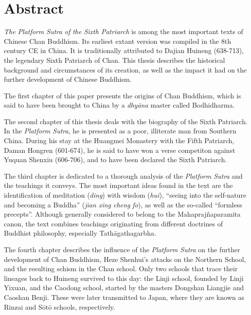 \chapter*{Abstract}
\textit{The Platform Sutra of the Sixth Patriarch} is among the most important texts of Chinese Chan Buddhism.
Its earliest extant version was compiled in the 8th century CE in China.
It is traditionally attributed to Dajian Huineng (638-713), the legendary Sixth Patriarch of Chan.
This thesis describes the historical background and circumstances of its creation, as well as the impact it had on the further development of Chinese Buddhism.

The first chapter of this paper presents the origins of Chan Buddhism, which is said to have been brought to China by a \textit{dhyāna} master called Bodhidharma.

The second chapter of this thesis deals with the biography of the Sixth Patriarch.
In the \textit{Platform Sutra}, he is presented as a poor, illiterate man from Southern China.
During his stay at the Huangmei Monastery with the Fifth Patriarch, Daman Hongren (601-674), he is said to have won a verse competiton against Yuquan Shenxiu (606-706), and to have been declared the Sixth Patriarch.

The third chapter is dedicated to a thorough analysis of the \textit{Platform Sutra} and the teachings it conveys.
The most important ideas found in the text are the identification of meditation (\textit{ding}) with wisdom (\textit{hui}), ``seeing into the self-nature and becoming a Buddha'' (\textit{jian xing cheng fo}), as well as the so-called ``formless precepts''.
Although generally considered to belong to the Mahaprajñaparamita canon, the text combines teachings originating from different doctrines of Buddhist philosophy, especially Tathāgathagarbha.

The fourth chapter describes the influence of the \textit{Platform Sutra} on the further development of Chan Buddhism, Heze Shenhui's attacks on the Northern School, and the resulting schism in the Chan school.
Only two schools that trace their lineages back to Huineng survived to this day: the Linji school, founded by Linji Yixuan, and the Caodong school, started by the masters Dongshan Liangjie and Caoshan Benji.
These were later transmitted to Japan, where they are known as Rinzai and Sōtō schools, respectively.

